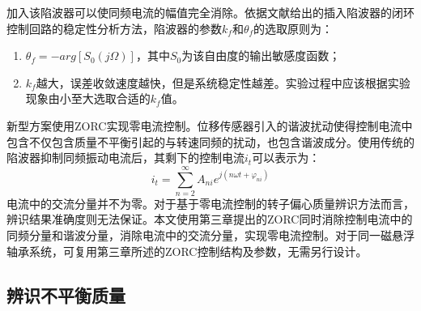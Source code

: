 \documentclass[
  lang=cn,
  degree=master,
  openany,oneside
]{nuaathesis}
\begin{document}
加入该陷波器可以使同频电流的幅值完全消除。依据文献给出的插入陷波器的闭环控制回路的稳定性分析方法，陷波器的参数$k_f$和$\theta _f$的选取原则为\cite{何家希2018磁悬浮高速电机主动振动控制方法及实验研究}：
\begin{enumerate}
	\item $\theta _f = - arg\left[ S_0(j\Omega) \right]$，其中$S_0$为该自由度的输出敏感度函数；
	\item $k_f$越大，误差收敛速度越快，但是系统稳定性越差。实验过程中应该根据实验现象由小至大选取合适的$k_f$值。
\end{enumerate}

新型方案使用ZORC实现零电流控制。位移传感器引入的谐波扰动使得控制电流中包含不仅包含质量不平衡引起的与转速同频的扰动，也包含谐波成分。使用传统的陷波器抑制同频振动电流后，其剩下的控制电流${i_t}$可以表示为：
\begin{equation}
	\label{eq:iz_0i_h}
	{i_t} = \sum\limits_{n = 2}^\infty  {{A_{ni}}{e^{j(n\omega t + {\varphi _{ni}})}}} 
\end{equation}
电流中的交流分量并不为零。对于基于零电流控制的转子偏心质量辨识方法而言，辨识结果准确度则无法保证。本文使用第三章提出的ZORC同时消除控制电流中的同频分量和谐波分量，消除电流中的交流分量，实现零电流控制。对于同一磁悬浮轴承系统，可复用第三章所述的ZORC控制结构及参数，无需另行设计。

\subsection{辨识不平衡质量}
\end{document}
